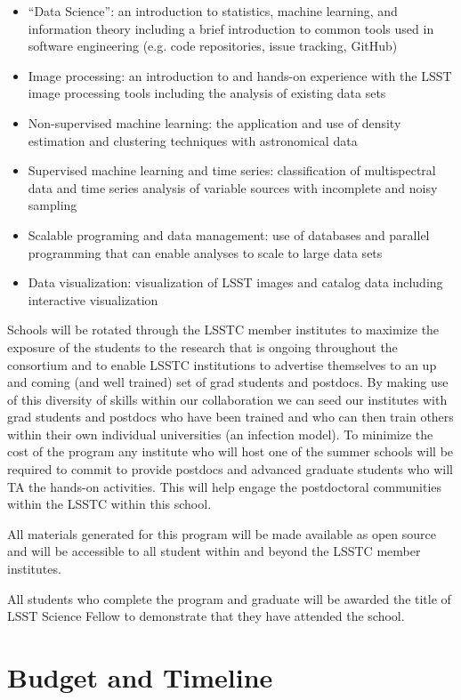 \documentclass[nofootbib,floatfix,11pt]{article}
\begin{document}
\begin{itemize}
\item “Data Science”: an introduction to statistics, machine learning, and information theory including a brief introduction to common tools used in software engineering (e.g. code repositories, issue tracking, GitHub)
\item Image processing: an introduction to and hands-on experience with the LSST image processing tools including the analysis of existing data sets
\item Non-supervised machine learning: the application and use of density estimation and clustering techniques with astronomical data
\item Supervised machine learning and time series: classification of multispectral data and time series analysis of variable sources with incomplete and noisy sampling
\item Scalable programing and data management: use of databases and parallel programming that can enable analyses to scale to large data sets
\item Data visualization: visualization of LSST images and catalog data including interactive visualization
\end{itemize}

Schools will be rotated through the LSSTC member institutes to maximize the exposure of the students to the research that is ongoing throughout the consortium and to enable LSSTC institutions to advertise themselves to an up and coming (and well trained) set of grad students and postdocs. By making use of this diversity of skills within our collaboration we can seed our institutes with grad students and postdocs who have been trained and who can then train others within their own individual universities (an infection model). To minimize the cost of the program any institute who will host one of the summer schools will be required to commit to provide postdocs and advanced graduate students who will TA the hands-on activities. This will help engage the postdoctoral communities within the LSSTC within this school. 

All materials generated for this program will be made available as open source and will be accessible to all student within and beyond the LSSTC member institutes.

All students who complete the program and graduate will be awarded the title of LSST Science Fellow to demonstrate that they have attended the school.


\section{Budget and Timeline}
\end{document}
